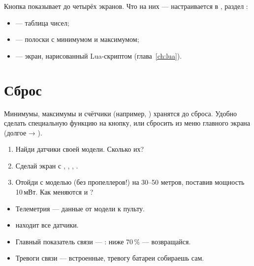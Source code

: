 Кнопка  показывает до четырёх экранов. Что на них --- настраивается в
, раздел :
\begin{itemize}
  \item {} --- таблица чисел;
  \item {} --- полоски с минимумом и максимумом;
  \item {} --- экран, нарисованный Lua-скриптом (глава~\ref{ch:lua}).
\end{itemize}

\begin{center}
\end{center}

\section{Сброс}

Минимумы, максимумы и счётчики (например, ) хранятся до сброса. Удобно сделать
специальную функцию  на кнопку, или сбросить из меню главного экрана
(долгое  → ).

\begin{tryit}
\begin{enumerate}
  \item Найди датчики своей модели. Сколько их?
  \item Сделай экран  с , , , .
  \item Отойди с моделью (без пропеллеров!) на 30--50 метров, поставив мощность 10\,мВт.
        Как меняются  и ?
\end{enumerate}
\end{tryit}

\begin{summary}
\begin{itemize}
  \item Телеметрия --- данные от модели к пульту.
  \item {} находит все датчики.
  \item Главный показатель связи --- : ниже 70\,\% --- возвращайся.
  \item Тревоги связи --- встроенные, тревогу батареи собираешь сам.
\end{itemize}
\end{summary}

